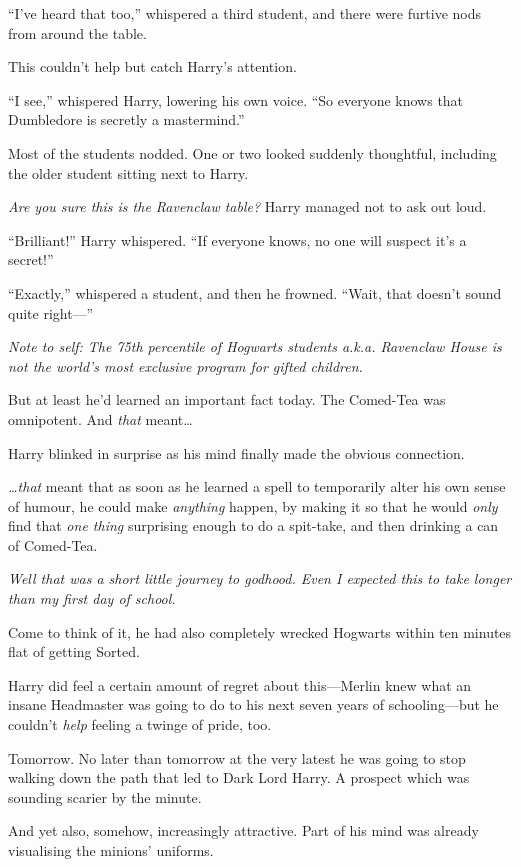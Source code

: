 ``I've heard that too,'' whispered a third student, and there were
furtive nods from around the table.

This couldn't help but catch Harry's attention.

``I see,'' whispered Harry, lowering his own voice. ``So everyone knows
that Dumbledore is secretly a mastermind.''

Most of the students nodded. One or two looked suddenly thoughtful,
including the older student sitting next to Harry.

\emph{Are you sure this is the Ravenclaw table?} Harry managed not to
ask out loud.

``Brilliant!'' Harry whispered. ``If everyone knows, no one will suspect
it's a secret!''

``Exactly,'' whispered a student, and then he frowned. ``Wait, that
doesn't sound quite right---''

\emph{Note to self: The 75th percentile of Hogwarts students a.k.a.
Ravenclaw House is not the world's most exclusive program for gifted
children.}

But at least he'd learned an important fact today. The Comed-Tea was
omnipotent. And \emph{that} meant\ldots{}

Harry blinked in surprise as his mind finally made the obvious
connection.

\emph{\ldots{}that} meant that as soon as he learned a spell to
temporarily alter his own sense of humour, he could make \emph{anything}
happen, by making it so that he would \emph{only} find that \emph{one
thing} surprising enough to do a spit-take, and then drinking a can of
Comed-Tea.

\emph{Well that was a short little journey to godhood. Even I expected
this to take longer than my first day of school.}

Come to think of it, he had also completely wrecked Hogwarts within ten
minutes flat of getting Sorted.

Harry did feel a certain amount of regret about this---Merlin knew what
an insane Headmaster was going to do to his next seven years of
schooling---but he couldn't \emph{help} feeling a twinge of pride, too.

Tomorrow. No later than tomorrow at the very latest he was going to stop
walking down the path that led to Dark Lord Harry. A prospect which was
sounding scarier by the minute.

And yet also, somehow, increasingly attractive. Part of his mind was
already visualising the minions' uniforms.

